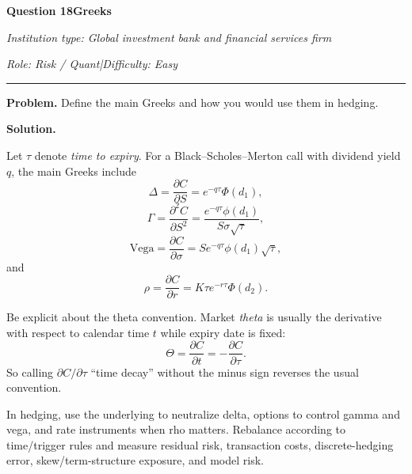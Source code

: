 \documentclass[11pt,letterpaper,openany]{book}
\newcommand{\InterviewQuestionHeader}[5]{%
  \vspace{1.0em}%
  {\large\bfseries #1\enspace #4\par}%
  {\small\itshape Institution type: #2\par}%
  {\small\itshape Role: #3\enspace |\enspace Difficulty: #5\par}%
  \vspace{0.25em}\hrule\vspace{0.45em}%
}
\begin{document}
\InterviewQuestionHeader{Question 18}{Global investment bank and financial services firm}{Risk / Quant}{Greeks}{Easy}
\textbf{Problem.} Define the main Greeks and how you would use them in hedging.

\textbf{Solution.}


Let \(\tau\) denote \emph{time to expiry}. For a Black--Scholes--Merton call with dividend yield \(q\), the main Greeks include
\[
\Delta=\frac{\partial C}{\partial S}=e^{-q\tau}\Phi(d_1),
\]
\[
\Gamma=\frac{\partial^2 C}{\partial S^2}
=\frac{e^{-q\tau}\phi(d_1)}{S\sigma\sqrt\tau},
\]
\[
\mathrm{Vega}=\frac{\partial C}{\partial\sigma}
=Se^{-q\tau}\phi(d_1)\sqrt\tau,
\]
and
\[
\rho=\frac{\partial C}{\partial r}=K\tau e^{-r\tau}\Phi(d_2).
\]

Be explicit about the theta convention. Market \emph{theta} is usually the derivative with respect to calendar time \(t\) while expiry date is fixed:
\[
\Theta=\frac{\partial C}{\partial t}=-\frac{\partial C}{\partial\tau}.
\]
So calling \(\partial C/\partial\tau\) ``time decay'' without the minus sign reverses the usual convention.

In hedging, use the underlying to neutralize delta, options to control gamma and vega, and rate instruments when rho matters. Rebalance according to time/trigger rules and measure residual risk, transaction costs, discrete-hedging error, skew/term-structure exposure, and model risk.
\end{document}
